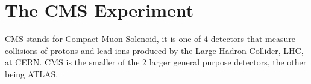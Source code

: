 \vspace{-3pt}
\section{The CMS Experiment}\label{sec:ch2:cms}

CMS stands for Compact Muon Solenoid, it is one of 4 detectors that measure collisions of protons and lead ions produced by the Large Hadron Collider, LHC, at CERN. CMS is the smaller of the 2 larger general purpose detectors, the other being ATLAS.



